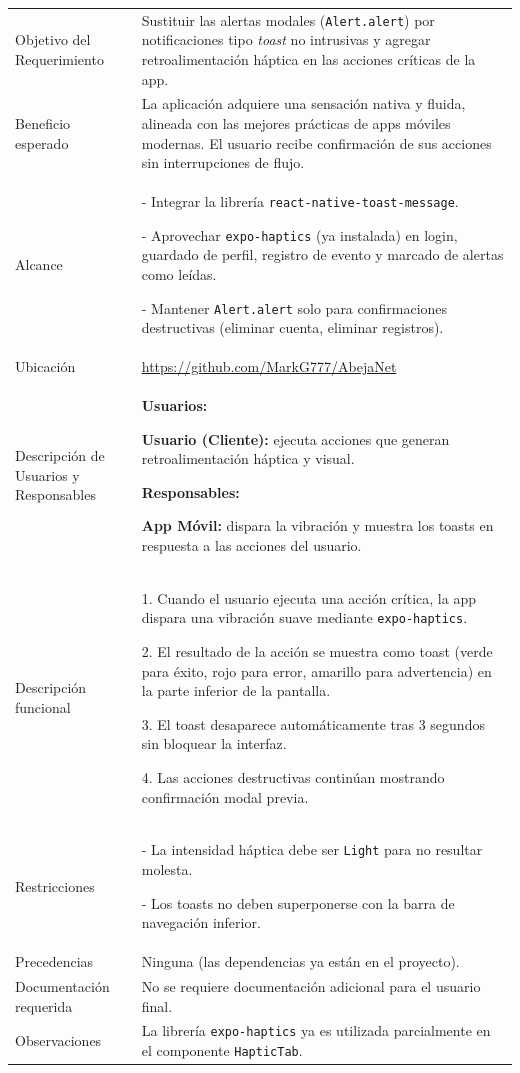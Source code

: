 \noindent
\begin{tabular}{|p{4.5cm}|p{11cm}|}
\hline
\rowcolor{secVerde}\multicolumn{2}{|l|}{\color{white}\textbf{3. DESCRIPCIÓN DEL REQUERIMIENTO}} \\
\hline
Objetivo del Requerimiento &
Sustituir las alertas modales (\texttt{Alert.alert}) por notificaciones tipo \textit{toast} no intrusivas y agregar retroalimentación háptica en las acciones críticas de la app. \\
\hline
Beneficio esperado &
La aplicación adquiere una sensación nativa y fluida, alineada con las mejores prácticas de apps móviles modernas. El usuario recibe confirmación de sus acciones sin interrupciones de flujo. \\
\hline
Alcance &
- Integrar la librería \texttt{react-native-toast-message}. \par
- Aprovechar \texttt{expo-haptics} (ya instalada) en login, guardado de perfil, registro de evento y marcado de alertas como leídas. \par
- Mantener \texttt{Alert.alert} solo para confirmaciones destructivas (eliminar cuenta, eliminar registros). \\
\hline
Ubicación & \url{https://github.com/MarkG777/AbejaNet} \\ \hline
Descripción de Usuarios y Responsables &
\textbf{Usuarios:} \par
\textbf{Usuario (Cliente):} ejecuta acciones que generan retroalimentación háptica y visual. \par
\vspace{0.1cm}
\textbf{Responsables:} \par
\textbf{App Móvil:} dispara la vibración y muestra los toasts en respuesta a las acciones del usuario. \\
\hline
Descripción funcional &
1. Cuando el usuario ejecuta una acción crítica, la app dispara una vibración suave mediante \texttt{expo-haptics}. \par
2. El resultado de la acción se muestra como toast (verde para éxito, rojo para error, amarillo para advertencia) en la parte inferior de la pantalla. \par
3. El toast desaparece automáticamente tras 3 segundos sin bloquear la interfaz. \par
4. Las acciones destructivas continúan mostrando confirmación modal previa. \\
\hline
Restricciones &
- La intensidad háptica debe ser \texttt{Light} para no resultar molesta. \par
- Los toasts no deben superponerse con la barra de navegación inferior. \\
\hline
Precedencias & Ninguna (las dependencias ya están en el proyecto). \\ \hline
Documentación requerida & No se requiere documentación adicional para el usuario final. \\ \hline
Observaciones & La librería \texttt{expo-haptics} ya es utilizada parcialmente en el componente \texttt{HapticTab}. \\ \hline
\end{tabular}

